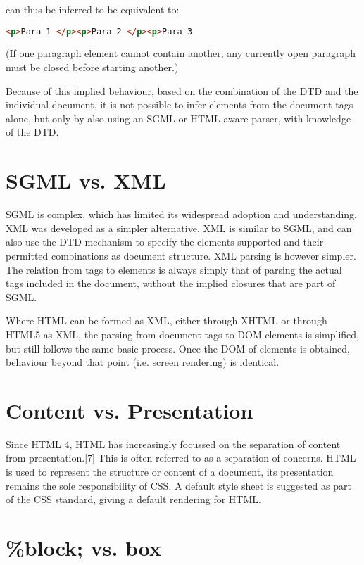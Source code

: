 can thus be inferred to be equivalent to:

\begin{lstlisting}[language=HTML]
<p>Para 1 </p><p>Para 2 </p><p>Para 3
\end{lstlisting}

(If one paragraph element cannot contain another, any currently open paragraph must be closed before starting another.)

Because of this implied behaviour, based on the combination of the DTD and the individual document, it is not possible to infer elements from the document tags alone, but only by also using an SGML or HTML aware parser, with knowledge of the DTD.


\section{SGML vs. XML}

SGML is complex, which has limited its widespread adoption and understanding. XML was developed as a simpler alternative. XML is similar to SGML, and can also use the DTD mechanism to specify the elements supported and their permitted combinations as document structure. XML parsing is however simpler. The relation from tags to elements is always simply that of parsing the actual tags included in the document, without the implied closures that are part of SGML.

Where HTML can be formed as XML, either through XHTML or through HTML5 as XML, the parsing from document tags to DOM elements is simplified, but still follows the same basic process. Once the DOM of elements is obtained, behaviour beyond that point (i.e. screen rendering) is identical.


\section{Content vs. Presentation}

Since HTML 4, HTML has increasingly focussed on the separation of content from presentation.[7] This is often referred to as a separation of concerns. HTML is used to represent the structure or content of a document, its presentation remains the sole responsibility of CSS. A default style sheet is suggested as part of the CSS standard, giving a default rendering for HTML.


\section{\%block; vs. box}



